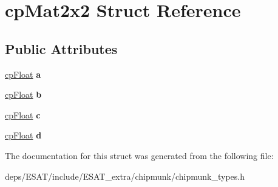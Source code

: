 \hypertarget{structcp_mat2x2}{}\section{cp\+Mat2x2 Struct Reference}
\label{structcp_mat2x2}
\subsection*{Public Attributes}
\begin{DoxyCompactItemize}
\item 
\mbox{\label{structcp_mat2x2_a3f392cee2281ef681ea192e22dae75fa}} 
\mbox{\hyperlink{group__basic_types_gac1ed65573e035bf892505768c852d8d3}{cp\+Float}} {\bfseries a}
\item 
\mbox{\label{structcp_mat2x2_a633387544257634501d1b8d3d3b7cb01}} 
\mbox{\hyperlink{group__basic_types_gac1ed65573e035bf892505768c852d8d3}{cp\+Float}} {\bfseries b}
\item 
\mbox{\label{structcp_mat2x2_aa64133ad4fce658b0ccd4626ca021b45}} 
\mbox{\hyperlink{group__basic_types_gac1ed65573e035bf892505768c852d8d3}{cp\+Float}} {\bfseries c}
\item 
\mbox{\label{structcp_mat2x2_a326abf4082ad424f8911f54c42a0e85c}} 
\mbox{\hyperlink{group__basic_types_gac1ed65573e035bf892505768c852d8d3}{cp\+Float}} {\bfseries d}
\end{DoxyCompactItemize}


The documentation for this struct was generated from the following file\+:\begin{DoxyCompactItemize}
\item 
deps/\+E\+S\+A\+T/include/\+E\+S\+A\+T\+\_\+extra/chipmunk/chipmunk\+\_\+types.\+h\end{DoxyCompactItemize}
